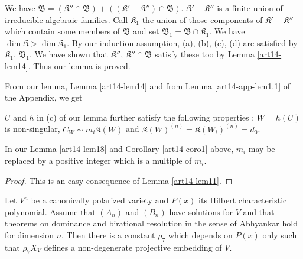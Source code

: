 We have $\mathfrak{B}=(\mathfrak{K}''\cap \mathfrak{B})+((\mathfrak{K}'-\mathfrak{K}'')\cap \mathfrak{B})$. $\mathfrak{K}'-\mathfrak{K}''$ is a finite union of irreducible algebraic families. Call $\mathfrak{K}_{1}$ the union of those components of $\mathfrak{K}'-\mathfrak{K}''$ which contain some members of $\mathfrak{B}$ and set $\mathfrak{B}_{1}=\mathfrak{B}\cap \mathfrak{K}_{1}$. We have $\dim \mathfrak{K}>\dim \mathfrak{K}_{1}$. By our induction assumption, (a), (b), (c), (d) are satisfied by $\mathfrak{K}_{1}$, $\mathfrak{B}_{1}$. We have shown that $\mathfrak{K}''$, $\mathfrak{K}''\cap \mathfrak{B}$ satisfy these too by Lemma \ref{art14-lem14}. Thus our lemma is proved.

From our lemma, Lemma \ref{art14-lem14} and from Lemma \ref{art14-app-lem1.1} of the Appendix, we get

\begin{corollary}\label{art14-coro1}
$U$ and $h$ in {\rm(c)} of our lemma further satisfy the following properties : $W=h(U)$ is non-singular, $C_{W}\sim m_{i}\mathfrak{K}(W)$ and $\mathfrak{K}(W)^{(n)}=\mathfrak{K}(W_{i})^{(n)}=d_{0}$.
\end{corollary}

\begin{corollary}\label{art14-coro2}
In our Lemma \ref{art14-lem18} and Corollary \ref{art14-coro1} above, $m_{i}$ may be replaced by a positive integer which is a multiple of $m_{i}$.
\end{corollary}

\begin{proof}
This is an easy consequence of Lemma \ref{art14-lem11}.
\end{proof}

\begin{theorem}\label{art14-thm2}
Let $V^{n}$ be a canonically polarized variety and $P(x)$ its Hilbert characteristic polynomial. Assume that $(A_{n})$ and $(B_{n})$ have solutions for $V$ and that theorems on dominance and birational resolution in the sense of Abhyankar hold for dimension $n$. Then there is a constant $\rho_{7}$ which depends on $P(x)$ only such that $\rho_{7}X_{V}$ defines a non-degenerate projective embedding of $V$.
\end{theorem}

